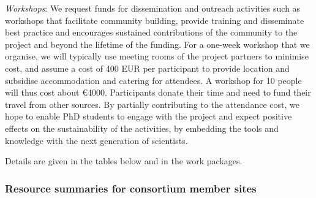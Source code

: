 \label{sect:budget-outreach-workshops}
\emph{Workshops}: We request funds for dissemination and outreach
activities such as workshops that facilitate community building,
provide training and disseminate best practice and encourages
sustained contributions of the community to the project and beyond the
lifetime of the funding. For a one-week workshop that we organise,
we will typically use meeting rooms of the project partners to minimise
cost, and assume a cost of 400 EUR per participant to provide location
and subsidise accommodation and catering for attendees. A workshop for 10 people
will thus cost about \euro{4000}. Participants
donate their time and need to fund their travel from other sources. By
partially contributing to the attendance cost, we hope to enable PhD
students to engage with the project and expect positive effects on the
sustainability of the activities, by embedding the tools and knowledge
with the next generation of scientists.

Details are given in the tables below and in the work packages.

\bigskip



 \subsubsection{Resource summaries for consortium member sites}
 \label{resources.summary}

